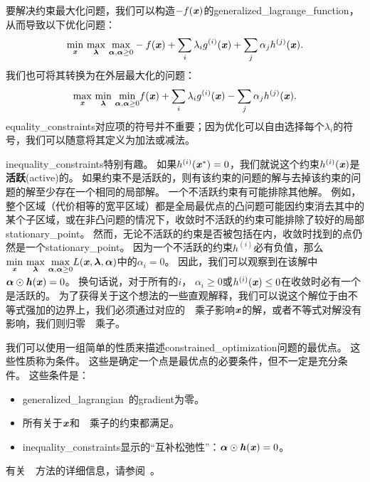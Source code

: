 
要解决约束最大化问题，我们可以构造$-f(\boldsymbol{\mathit{x}})$的\gls{generalized_lagrange_function}，从而导致以下优化问题：
\begin{align}
 \underset{\boldsymbol{\mathit{x}}}{\min}~ \underset{\boldsymbol{\lambda}}{\max}  ~
 \underset{\boldsymbol{\alpha}, \boldsymbol{\alpha} \geq 0}{\max} 
  -f(\boldsymbol{\mathit{x}}) + \sum_i \lambda_i g^{(i)}(\boldsymbol{\mathit{x}})  + \sum_j \alpha_j h^{(j)}(\boldsymbol{\mathit{x}}).
\end{align}
我们也可将其转换为在外层最大化的问题：
\begin{align}
 \underset{\boldsymbol{\mathit{x}}}{\max}~ \underset{\boldsymbol{\lambda}}{\min}~
 \underset{\boldsymbol{\alpha}, \boldsymbol{\alpha} \geq 0}{\min} 
  f(\boldsymbol{\mathit{x}}) + \sum_i \lambda_i g^{(i)}(\boldsymbol{\mathit{x}}) - \sum_j \alpha_j h^{(j)}(\boldsymbol{\mathit{x}}).
\end{align}
\gls{equality_constraints}对应项的符号并不重要；因为优化可以自由选择每个$\lambda_i$的符号，我们可以随意将其定义为加法或减法。

\gls{inequality_constraints}特别有趣。
如果$h^{(i)}(\boldsymbol{\mathit{x}}^*)= 0$，我们就说这个约束$h^{(i)}(\boldsymbol{\mathit{x}})$是\textbf{活跃}(active)的。
如果约束不是活跃的，则有该约束的问题的解与去掉该约束的问题的解至少存在一个相同的局部解。
一个不活跃约束有可能排除其他解。
例如，整个区域（代价相等的宽平区域）都是全局最优点的凸问题可能因约束消去其中的某个子区域，或在非凸问题的情况下，收敛时不活跃的约束可能排除了较好的局部\gls{stationary_point}。
然而，无论不活跃的约束是否被包括在内，收敛时找到的点仍然是一个\gls{stationary_point}。
因为一个不活跃的约束$h^{(i)}$必有负值，那么$
 \underset{\boldsymbol{\mathit{x}}}{\min}~  \underset{\boldsymbol{\lambda}}{\max}~
 \underset{\boldsymbol{\alpha}, \boldsymbol{\alpha} \geq 0}{\max}   L(\boldsymbol{\mathit{x}}, \boldsymbol{\lambda}, \boldsymbol{\alpha}) 
$中的$\alpha_i = 0$。
因此，我们可以观察到在该解中$\boldsymbol{\alpha} \odot \boldsymbol{\mathit{h}}(\boldsymbol{\mathit{x}}) = 0$。
换句话说，对于所有的$i$， $\alpha_i \geq 0$或$ h^{(i)}(\boldsymbol{\mathit{x}}) \leq 0$在收敛时必有一个是活跃的。
为了获得关于这个想法的一些直观解释，我们可以说这个解位于由不等式强加的边界上，我们必须通过对应的~~乘子影响$\boldsymbol{\mathit{x}}$的解，或者不等式对解没有影响，我们则归零~~乘子。

我们可以使用一组简单的性质来描述\gls{constrained_optimization}问题的最优点。
这些性质称为条件\citep{Karush39,kuhn1951}。
这些是确定一个点是最优点的必要条件，但不一定是充分条件。
这些条件是：
\begin{itemize}
 \item \gls{generalized_lagrangian}~的\gls{gradient}为零。
 \item 所有关于$\boldsymbol{\mathit{x}}$和~~乘子的约束都满足。
 \item \gls{inequality_constraints}显示的``互补松弛性''：$\boldsymbol{\alpha} \odot \boldsymbol{\mathit{h}}(\boldsymbol{\mathit{x}}) = 0$。
\end{itemize}
有关~~方法的详细信息，请参阅~\cite{NumOptBook}。

